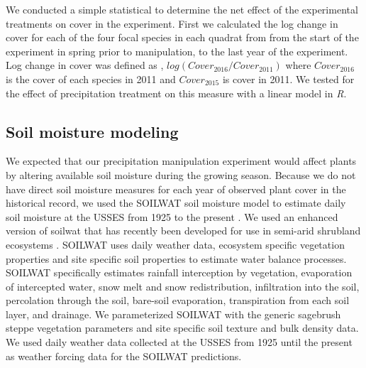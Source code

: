\documentclass[11pt]{article}
\begin{document}
\begin{doublespacing}
We conducted a simple statistical to determine the net effect of the experimental treatments on cover in the experiment. First we calculated the log change in cover for each of the four focal species in each quadrat from from the start of the experiment in spring prior to manipulation, to the last year of the experiment. Log change in cover was defined as , $log(Cover_{2016}/Cover_{2011})$ where $Cover_{2016}$ is the cover of each species in 2011 and $Cover_{2015}$ is cover in 2011. We tested for the effect of precipitation treatment on this measure with a linear model in \textit{R}.

\subsection*{Soil moisture modeling}

We expected that our precipitation manipulation experiment would affect plants by altering available soil moisture during the growing season.  Because we do not have direct soil moisture measures for each year of observed plant cover in the historical record, we used the SOILWAT soil moisture model to estimate daily soil moisture at the USSES from 1925 to the present \citep{Parton_1978}. We used an enhanced version of soilwat that has recently been developed for use in semi-arid shrubland ecosystems \citep{Bradford}. SOILWAT uses daily weather data, ecosystem specific vegetation properties and site specific soil properties to estimate water balance processes. SOILWAT specifically estimates rainfall interception by vegetation, evaporation of intercepted water, snow melt and snow redistribution, infiltration into the soil, percolation through the soil, bare-soil evaporation, transpiration from each soil layer, and drainage. We parameterized SOILWAT with the generic sagebrush steppe vegetation parameters and site specific soil texture and bulk density data. We used daily weather data collected at the USSES from 1925 until the present as weather forcing data for the SOILWAT predictions.  


\end{doublespacing}
\end{document}
